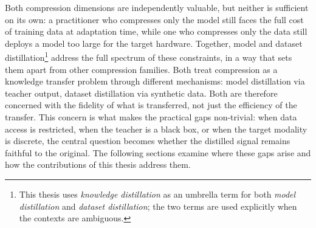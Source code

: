 \begin{foldable}
  Both compression dimensions are independently valuable, but neither is sufficient on its own: a practitioner who compresses only the model still faces the full cost of training data at adaptation time, while one who compresses only the data still deploys a model too large for the target hardware.
  Together, model and dataset distillation\footnote{This thesis uses \textit{knowledge distillation} as an umbrella term for both \textit{model distillation} and \textit{dataset distillation}; the two terms are used explicitly when the contexts are ambiguous.} address the full spectrum of these constraints, in a way that sets them apart from other compression families.
  Both treat compression as a knowledge transfer problem through different mechanisms: model distillation via teacher output, dataset distillation via synthetic data.
  Both are therefore concerned with the fidelity of what is transferred, not just the efficiency of the transfer.
  This concern is what makes the practical gaps non-trivial: when data access is restricted, when the teacher is a black box, or when the target modality is discrete, the central question becomes whether the distilled signal remains faithful to the original.
  The following sections examine where these gaps arise and how the contributions of this thesis address them.
\end{foldable}
